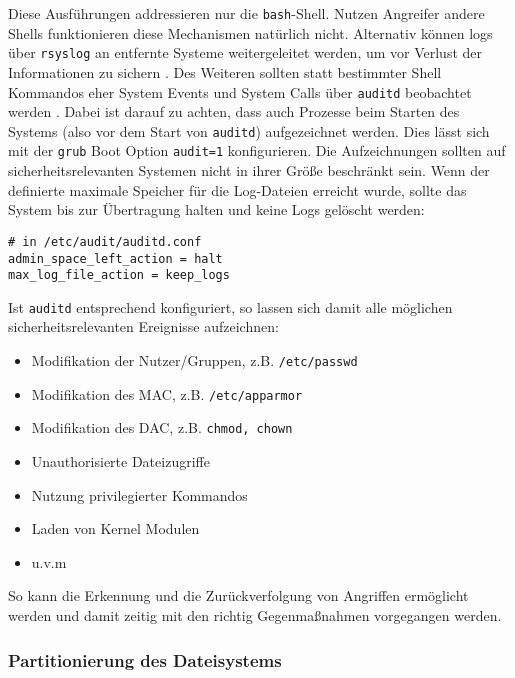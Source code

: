 Diese Ausführungen addressieren nur die \texttt{bash}-Shell. Nutzen Angreifer andere Shells funktionieren diese Mechanismen natürlich nicht. 
Alternativ können logs über \texttt{rsyslog} an entfernte Systeme weitergeleitet werden, um vor Verlust der Informationen zu sichern \cite{cis}. 
Des Weiteren sollten statt bestimmter Shell Kommandos eher System Events und System Calls über \texttt{auditd} beobachtet werden \cite{cis}. Dabei ist darauf zu achten, dass auch Prozesse beim Starten des Systems (also vor dem Start von \texttt{auditd}) aufgezeichnet werden. Dies lässt sich mit der \texttt{grub} Boot Option \texttt{audit=1} konfigurieren. Die Aufzeichnungen sollten auf sicherheitsrelevanten Systemen nicht in ihrer Größe beschränkt sein. Wenn der definierte
maximale Speicher für die Log-Dateien erreicht wurde, sollte das System bis zur Übertragung halten und keine Logs gelöscht werden:

\begin{lstlisting}
# in /etc/audit/auditd.conf
admin_space_left_action = halt
max_log_file_action = keep_logs
\end{lstlisting}

Ist \texttt{auditd} entsprechend konfiguriert, so lassen sich damit alle möglichen sicherheitsrelevanten Ereignisse aufzeichnen:

\begin{itemize}
    \item Modifikation der Nutzer/Gruppen, z.B. \texttt{/etc/passwd}
    \item Modifikation des MAC, z.B. \texttt{/etc/apparmor}
    \item Modifikation des DAC, z.B. \texttt{chmod, chown}
    \item Unauthorisierte Dateizugriffe
    \item Nutzung privilegierter Kommandos
    \item Laden von Kernel Modulen
    \item u.v.m
\end{itemize}

So kann die Erkennung und die Zurückverfolgung von Angriffen ermöglicht werden und damit zeitig mit den richtig Gegenmaßnahmen vorgegangen werden.


\subsubsection{Partitionierung des Dateisystems}

